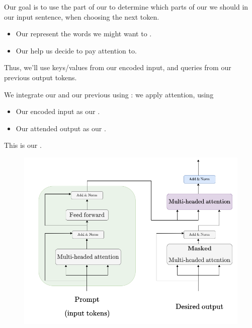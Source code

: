         Our goal is to use the  part of our  to determine which parts of our  we should  in our input sentence, when choosing the next token.

        \begin{itemize}
            \item Our  represent the words we might want to .

            \item Our  help us decide  to pay attention to.
        \end{itemize}

        Thus, we'll use keys/values from our encoded input, and queries from our previous output tokens.\\

        \begin{concept}
            We integrate our  and our previous  using : we apply attention, using

            \begin{itemize}
                \item Our encoded input as our .

                \item Our attended output as our .
            \end{itemize}

            This is our .
        \end{concept}

        \begin{figure}[H]
            \centering
            \includegraphics[width=0.65\linewidth]{images/transformers_images/cross_attention_decoder.png}
        \end{figure}

